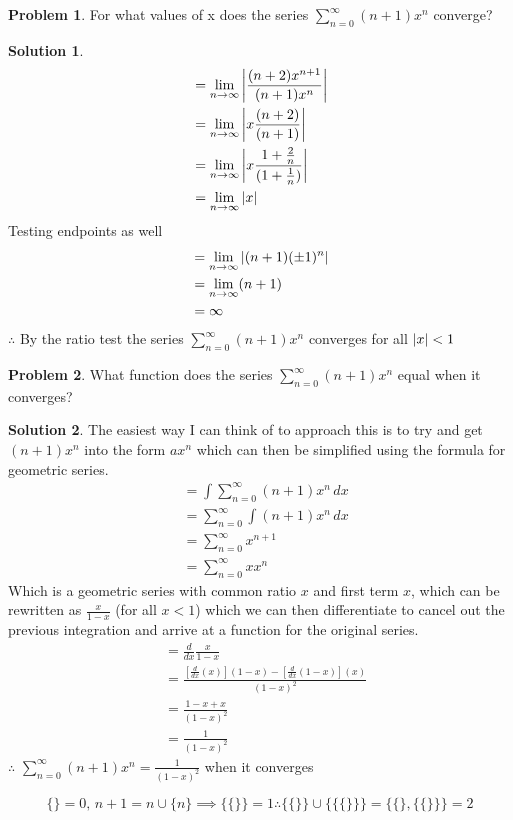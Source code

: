 \documentclass[10pt]{article}
\theoremstyle{definition}
\newtheorem{problem}{Problem}
\newtheorem{soln}{Solution}
\begin{document}
\begin{problem}
For what values of x does the series $\displaystyle \sum_{n = 0}^{\infty} (n+1)x^n$ converge?
\end{problem}
\begin{soln}
      \begin{align*}
             & = \lim_{n \to \infty} \abs{\frac{(n+2)x^{n+1}}{(n+1)x^n}}          \\
             & = \lim_{n \to \infty} \abs{x\frac{(n+2)}{(n+1)}}                   \\
             & = \lim_{n \to \infty} \abs{x\frac{1+\frac{2}{n}}{(1+\frac{1}{n})}} \\
             & = \lim_{n \to \infty} \abs{x}
      \end{align*}
      \noindent Testing endpoints as well
      \begin{align*}
             & = \lim_{n \to \infty} \abs{(n+1)(\pm 1)^n} \\
             & = \lim_{n \to \infty} (n+1)                \\
             & = \infty
      \end{align*}
      \noindent $\therefore$ By the ratio test the series $\displaystyle \sum_{n = 0}^{\infty} (n+1)x^n$ converges for all $\abs{x}<1$
\end{soln}

\begin{problem}
What function does the series $\displaystyle \sum_{n = 0}^{\infty} (n+1)x^n$ equal when it converges?
\end{problem}
\begin{soln} The easiest way I can think of to approach this is to try and get $(n+1)x^n$ into the form $ax^n$ which can then be simplified using the formula for geometric series.
      \begin{align*}
             & = \int \sum_{n = 0}^{\infty} (n+1)x^n \,dx \\
             & = \sum_{n = 0}^{\infty} \int (n+1)x^n \,dx \\
             & = \sum_{n = 0}^{\infty} x^{n+1}            \\
             & = \sum_{n = 0}^{\infty} xx^n
      \end{align*}
      Which is a geometric series with common ratio $x$ and first term $x$, which can be rewritten as $\frac{x}{1-x}$ (for all $x<1$) which we can then differentiate to cancel out the previous integration and arrive at a
      function for the original series.
      \begin{align*}
             & = \frac{d}{dx} \frac{x}{1-x}                                                          \\
             & = \frac{\left[\frac{d}{dx}(x)\right](1-x)-\left[\frac{d}{dx}(1-x)\right](x)}{(1-x)^2} \\
             & = \frac{1-x+x}{(1-x)^2}                                                               \\
             & = \frac{1}{(1-x)^2}
      \end{align*}
      \noindent $\therefore$ $\displaystyle \sum_{n = 0}^{\infty} (n+1)x^n = \frac{1}{(1-x)^2}$ when it converges
\end{soln}

$$\{\}=0, \, n+1=n\cup \{n\} \implies \{\{\}\}=1 \therefore \{\{\}\}\cup\{\{\{\}\}\}=\{\{\},\{\{\}\}\}=2$$
\end{document}
